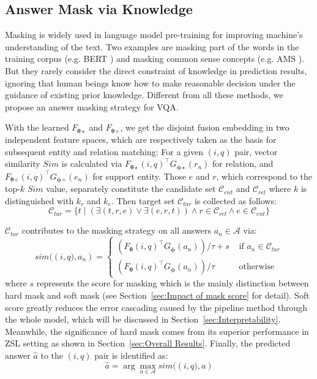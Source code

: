 \documentclass[runningheads]{llncs}
\newcommand{\cjy}[1]{{\color{black}#1}}
\begin{document}
\subsection{Answer Mask via Knowledge}
\cjy{Masking is widely used in language model pre-training for improving machine's understanding of the text. Two examples are masking part of the words in the training corpus
 (e.g. BERT \cite{DBLP:conf/naacl/DevlinCLT19}) and} masking common sense concepts (e.g. AMS \cite{DBLP:journals/corr/abs-1908-06725}). 
But they rarely consider the direct constraint of knowledge in prediction results, \cjy{ignoring that }human beings know how to make reasonable decision under the guidance of existing prior knowledge.
Different from all these methods, we propose an answer masking strategy for VQA.

With the learned $F_{\boldsymbol{\theta\star}}$ and $F_{\boldsymbol{\theta\diamond}}$, we get the disjoint fusion embedding in two independent feature spaces, which are respectively taken as the basis for subsequent entity and relation matching:  
For a given $(i,q)$ pair, vector similarity $Sim$ is calculated  via $F_{\boldsymbol{\theta\star}}(i, q)^{\top} G_{\boldsymbol{\phi\star}}(r_n)$ for relation, and $F_{\boldsymbol{\theta\diamond}}(i, q)^{\top} G_{\boldsymbol{\phi\diamond}}(e_n)$ for support entity. Those $e$ and $r$, which correspond to the top-$k$ $Sim$ value, separately constitute the candidate set $\mathcal{C}_{ent}$ and $\mathcal{C}_{rel}$ 
where $k$ is distinguished with $k_r$ and $k_e$.
Then target set $\mathcal{C}_{tar}$ is collected  as follows:
\begin{equation}
	\mathcal{C}_{tar} = \{t \mid (\exists (t,r,e)\lor\exists (e,r,t))\wedge r\in \mathcal{C}_{rel} \wedge e \in \mathcal{C}_{ent} \}
\end{equation}

$\mathcal{C}_{tar}$ contributes to the masking strategy on all answers $a_n \in \mathcal{A}$ via:
\begin{equation}
sim(\left(i,q),a_n\right)=\left\{\begin{array}{ll}
(F_{\boldsymbol{\theta}}(i, q)^{\top} G_{\boldsymbol{\phi}}(a_n))/\tau + s & \text { if } a_n\in \mathcal{C}_{tar}\\
(F_{\boldsymbol{\theta}}(i, q)^{\top} G_{\boldsymbol{\phi}}(a_n))/\tau  & \text { otherwise }
\end{array}\right.
\end{equation}
where $s$ represents the score for masking which is the mainly distinction between hard mask and soft mask (see Section~\ref{sec:Impact of mask score} for detail). Soft score greatly reduces the error cascading caused by the pipeline method through the whole model, which will be discussed in Section~\ref{sec:Interpretability}. Meanwhile, the significance of hard mask comes from its superior performance in ZSL setting as shown in Section~\ref{sec:Overall Results}.
Finally, the predicted answer $\hat{a}$ to the $(i, q)$ pair is identified as:
\begin{equation}
\hat{a}=\arg \max _{a \in \mathcal{A}} sim(\left(i,q),a\right)	
\end{equation}
\end{document}
